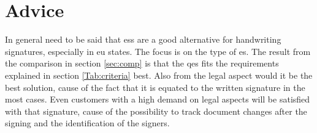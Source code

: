 \section{Advice}
In general need to be said that \glspl{es} are a good alternative for handwriting signatures, especially in \gls{eu} states. The focus is on the type of \gls{es}. The result from the comparison in section \ref{sec:comp} is that the \gls{qes} fits the requirements explained in section \ref{Tab:criteria} best. Also from the legal aspect would it be the best solution, cause of the fact that it is equated to the written signature in the most cases. Even customers with a high demand on legal aspects will be satisfied with that signature, cause of the possibility to track document changes after the signing and the identification of the signers. 